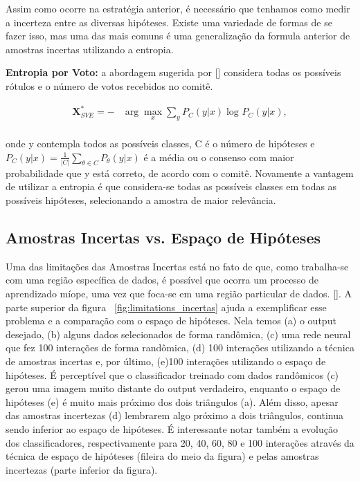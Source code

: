 Assim como ocorre na estratégia anterior, é necessário que tenhamos como medir a incerteza entre as diversas hipóteses. Existe uma variedade de formas de se fazer isso, mas uma das mais comuns é uma generalização da formula anterior de amostras incertas utilizando a entropia.

\textbf{Entropia por Voto:} a abordagem sugerida por [\cite{dagan1995committee}] considera todas os possíveis rótulos e o número de votos recebidos no comitê. 

\begin{align*}
\textbf{X}^*_{SVE} = - &\arg\max_{x} \sum_{y} P_{C}  (y\lvert x) \log_{} P_{C}  (y\lvert x),\\
\end{align*}

onde y contempla todos as possíveis classes, C é o número de hipóteses e $P_{C}  (y\lvert x) = \frac{1}{|C|}  \sum_{\theta \in C} P_{\theta}  (y\lvert x)$ é a média ou o consenso com maior probabilidade que y está correto, de acordo com o comitê. Novamente a vantagem de utilizar a entropia é que considera-se todas as possíveis classes em todas as possíveis hipóteses, selecionando a amostra de maior relevância.


\subsection{Amostras Incertas vs. Espaço de Hipóteses} 
\label{sec:minimizing_expected}

Uma das limitações das Amostras Incertas está no fato de que, como trabalha-se com uma região específica de dados, é possível que ocorra um processo de aprendizado míope, uma vez que foca-se em uma região particular de dados.  [\cite{settles2014active}]. A parte superior da figura ~\ref{fig:limitations_incertas} ajuda a exemplificar esse problema e a comparação com o espaço de hipóteses. Nela temos (a) o output desejado, (b) alguns dados selecionados de forma randômica, (c) uma rede neural que fez 100 interações de forma randômica, (d) 100 interações utilizando a técnica de amostras incertas e, por último, (e)100 interações utilizando o espaço de hipóteses. É perceptível que o classificador treinado com dados randômicos (c) gerou uma imagem muito distante do output verdadeiro, enquanto o espaço de hipóteses (e) é muito mais próximo dos dois triângulos (a). Além disso, apesar das amostras incertezas (d) lembrarem algo próximo a dois triângulos, continua sendo inferior ao espaço de hipóteses. É interessante notar também a evolução dos classificadores, respectivamente para 20, 40, 60, 80 e 100 interações através da técnica de espaço de hipóteses (fileira do meio da figura) e pelas amostras incertezas (parte inferior da figura).

